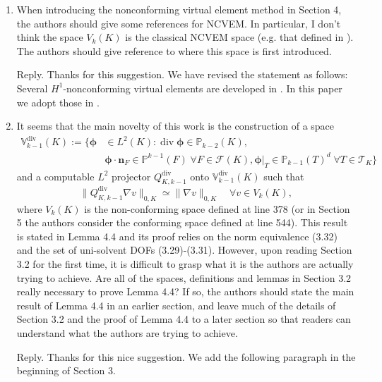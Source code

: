 \documentclass[10pt]{amsart}
\theoremstyle{definition}
\theoremstyle{remark}
\renewcommand{\div}{\operatorname{div}}
\begin{document}
\begin{enumerate}[1.]
\item \textsf{When introducing the nonconforming virtual element method in Section 4, the authors should give some references for NCVEM. In particular, I don’t think the space $V_k(K)$ is the classical NCVEM space (e.g. that defined in \cite{AyusodeDiosLipnikovManzini2016}). The authors should give reference to where this space is first introduced.}

\smallskip \noindent \textcolor[rgb]{1.00,0.00,0.00}{Reply.}
Thanks for this suggestion. We have revised the statement as follows:
Several $H^1$-nonconforming virtual elements are developed in \cite{AyusodeDiosLipnikovManzini2016,CangianiManziniSutton2017,ChenHuang2020ncvem,Huang2020}.
In this paper we adopt those in \cite{CangianiManziniSutton2017,ChenHuang2020ncvem}.

\medskip

\item \textsf{It seems that the main novelty of this work is the construction of a space
\begin{align*}
\mathbb V_{k-1}^{\div}(K):=\{\boldsymbol{\phi}&\in L^2(K): \div\boldsymbol{\phi}\in\mathbb P_{k-2}(K), \\
& \boldsymbol{\phi}\cdot\boldsymbol{n}_F\in\mathbb P^{k-1}(F)\;\forall F\in\mathcal F(K), \boldsymbol{\phi}|_T\in\mathbb P_{k-1}(T)^d\;\forall T\in\mathcal T_K
\}
\end{align*}
and a computable $L^2$ projector $Q_{K,k-1}^{\div}$ onto $\mathbb V_{k-1}^{\div}(K)$ such that
$$
\|Q_{K,k-1}^{\div}\nabla v\|_{0,K}\simeq \|\nabla v\|_{0,K} \quad\forall v\in V_k(K),
$$
where $V_k(K)$ is the non-conforming space defined at line 378 (or in Section 5 the authors consider the conforming space defined at line 544). This result is stated in Lemma 4.4 and its proof relies on the norm equivalence (3.32) and the set of uni-solvent DOFs (3.29)-(3.31). However, upon reading Section 3.2 for the first time, it is difficult to grasp what it is the authors are actually trying to achieve. Are all of the spaces, definitions and lemmas in Section 3.2 really necessary to prove Lemma 4.4? If so, the authors should state the main result of Lemma 4.4 in an earlier section, and leave much of the details of Section 3.2 and the proof of Lemma 4.4 to a later section so that readers can understand what the authors are trying to achieve.}

\smallskip \noindent \textcolor[rgb]{1.00,0.00,0.00}{Reply.}
Thanks for this nice suggestion. We add the following paragraph in the beginning of Section 3.


\end{enumerate}
\end{document}
